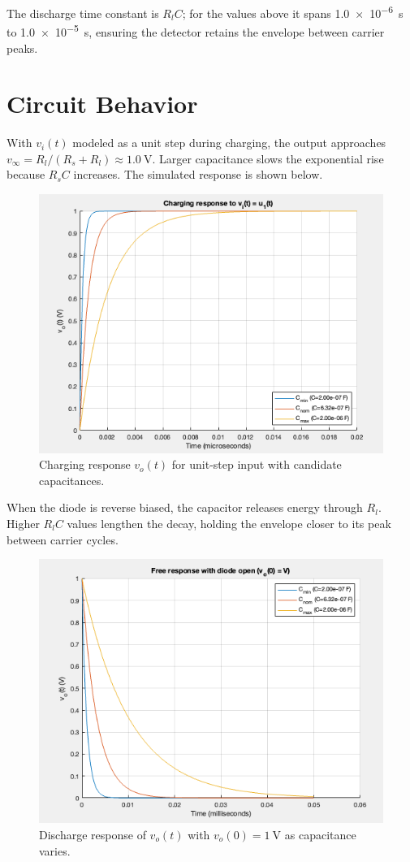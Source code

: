 \documentclass[12pt]{article}
\begin{document}
The discharge time constant is $R_l C$; for the values above it spans \SI{1.0e-6}{\second} to \SI{1.0e-5}{\second}, ensuring the detector retains the envelope between carrier peaks.

\clearpage
\section*{Circuit Behavior}
With $v_i(t)$ modeled as a unit step during charging, the output approaches $v_\infty = R_l/(R_s+R_l) \approx \SI{1.0}{\volt}$. Larger capacitance slows the exponential rise because $R_s C$ increases. The simulated response is shown below.

\begin{figure}[H]
    \centering
    \includegraphics[width=0.9\linewidth]{Figure 1 Task 5.png}
    \caption{Charging response $v_o(t)$ for unit-step input with candidate capacitances.}
\end{figure}

When the diode is reverse biased, the capacitor releases energy through $R_l$. Higher $R_l C$ values lengthen the decay, holding the envelope closer to its peak between carrier cycles.

\begin{figure}[H]
    \centering
    \includegraphics[width=0.9\linewidth]{Figure 2 Task 6.png}
    \caption{Discharge response of $v_o(t)$ with $v_o(0)=\SI{1}{\volt}$ as capacitance varies.}
\end{figure}
\end{document}
